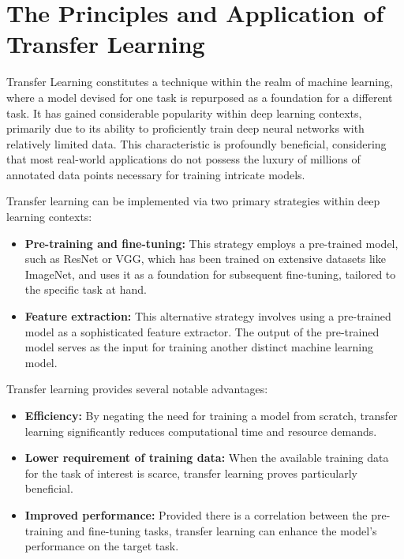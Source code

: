 \renewcommand{\chapterpath}[1]{Chapters/drive_net/#1}
\renewcommand{\figurepath}[1]{Chapters/drive_net/figures/#1}

\chapter{The Principles and Application of Transfer Learning}\label{ch:transfer_learning}

Transfer Learning constitutes a technique within the realm of machine learning, where a model devised for one task is repurposed as a foundation for a different task. It has gained considerable popularity within deep learning contexts, primarily due to its ability to proficiently train deep neural networks with relatively limited data. This characteristic is profoundly beneficial, considering that most real-world applications do not possess the luxury of millions of annotated data points necessary for training intricate models.

Transfer learning can be implemented via two primary strategies within deep learning contexts:

\begin{itemize}
    \item \textbf{Pre-training and fine-tuning:} This strategy employs a pre-trained model, such as ResNet or VGG, which has been trained on extensive datasets like ImageNet, and uses it as a foundation for subsequent fine-tuning, tailored to the specific task at hand.
    \item \textbf{Feature extraction:} This alternative strategy involves using a pre-trained model as a sophisticated feature extractor. The output of the pre-trained model serves as the input for training another distinct machine learning model.
\end{itemize}

Transfer learning provides several notable advantages:

\begin{itemize}
    \item \textbf{Efficiency:} By negating the need for training a model from scratch, transfer learning significantly reduces computational time and resource demands.
    \item \textbf{Lower requirement of training data:} When the available training data for the task of interest is scarce, transfer learning proves particularly beneficial.
    \item \textbf{Improved performance:} Provided there is a correlation between the pre-training and fine-tuning tasks, transfer learning can enhance the model's performance on the target task.
\end{itemize}

